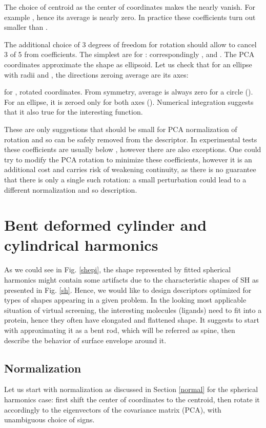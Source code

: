 \documentclass[10pt,journal]{IEEEtranTCOM}
\theoremstyle{plain}
\begin{document}
The choice of centroid as the center of coordinates makes the  nearly vanish. For example , hence its average is nearly zero. In practice these coefficients turn out smaller than .

The additional choice of 3 degrees of freedom for rotation should allow to cancel 3 of 5 from  coefficients. The simplest are for : correspondingly ,  and . The PCA coordinates approximate the shape as ellipsoid. Let us check that for an ellipse with radii  and , the directions zeroing average  are its axes:



for ,  rotated coordinates. From symmetry, average  is always zero for a circle (). For an ellipse, it is zeroed only for both axes (). Numerical integration suggests that it also true for the interesting  function.

These are only suggestions that  should be small for PCA normalization of rotation and so can be safely removed from the descriptor. In experimental tests these coefficients are usually below , however there are also exceptions. One could try to modify the PCA rotation to minimize these coefficients, however it is an additional cost and carries risk of weakening continuity, as there is no guarantee that there is only a single such rotation: a small perturbation could lead to a different normalization and so description.

\section{Bent deformed cylinder and cylindrical harmonics}
As we could see in Fig. \ref{shepi}, the shape represented by fitted spherical harmonics might contain some artifacts due to the characteristic shapes of SH as presented in Fig. \ref{sh}. Hence, we would like to design descriptors optimized for types of shapes appearing in a given problem. In the looking most applicable situation of virtual screening, the interesting molecules (ligands) need to fit into a protein, hence they often have elongated and flattened shape. It suggests to start with approximating it as a bent rod, which will be referred as spine, then describe the behavior of surface envelope around it.
\subsection{Normalization}
Let us start with normalization as discussed in Section \ref{normal} for the spherical harmonics case: first shift the center of coordinates to the centroid, then rotate it accordingly to the eigenvectors of the covariance matrix (PCA), with unambiguous choice of signs.
\end{document}
